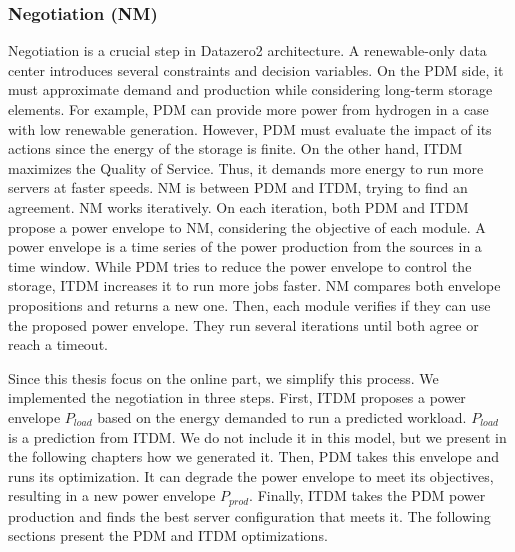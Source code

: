 \subsubsection{Negotiation (NM)}
Negotiation is a crucial step in Datazero2 architecture. A renewable-only data center introduces several constraints and decision variables. On the PDM side, it must approximate demand and production while considering long-term storage elements. For example, PDM can provide more power from hydrogen in a case with low renewable generation. However, PDM must evaluate the impact of its actions since the energy of the storage is finite. On the other hand, ITDM maximizes the Quality of Service. Thus, it demands more energy to run more servers at faster speeds. NM is between PDM and ITDM, trying to find an agreement. NM works iteratively. On each iteration, both PDM and ITDM propose a power envelope to NM, considering the objective of each module. A power envelope is a time series of the power production from the sources in a time window. While PDM tries to reduce the power envelope to control the storage, ITDM increases it to run more jobs faster. NM compares both envelope propositions and returns a new one. Then, each module verifies if they can use the proposed power envelope. They run several iterations until both agree or reach a timeout.

Since this thesis focus on the online part, we simplify this process. We implemented the negotiation in three steps. First, ITDM proposes a power envelope $P_{load}$ based on the energy demanded to run a predicted workload. $P_{load}$ is a prediction from ITDM. We do not include it in this model, but we present in the following chapters how we generated it. Then, PDM takes this envelope and runs its optimization. It can degrade the power envelope to meet its objectives, resulting in a new power envelope $P_{prod}$. Finally, ITDM takes the PDM power production and finds the best server configuration that meets it. The following sections present the PDM and ITDM optimizations.

